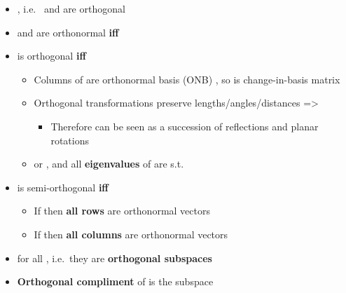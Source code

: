 \begin{itemize}

\item
  , i.e.~ and  are
  orthogonal
\item
   and  are orthonormal \textbf{iff}
\item
   is orthogonal \textbf{iff}

  \begin{itemize}
  
  \item
    Columns of  are
    orthonormal basis (ONB)
    ,
    so  is change-in-basis matrix
  \item
    Orthogonal transformations preserve lengths/angles/distances
    =\textgreater{}

    \begin{itemize}
    
    \item
      Therefore can be seen as a succession of reflections and planar
      rotations
    \end{itemize}
  \item
     or , and all
    \textbf{eigenvalues} of  are s.t.
  \end{itemize}
\item
   is semi-orthogonal \textbf{iff}

  \begin{itemize}
  
  \item
    If  then \textbf{all  rows} are orthonormal
    vectors
  \item
    If  then \textbf{all  columns} are orthonormal
    vectors
  \end{itemize}
\item
  for all , i.e.~they are
  \textbf{orthogonal subspaces}
\item
  \textbf{Orthogonal compliment} of  is
  the subspace


\end{itemize}
